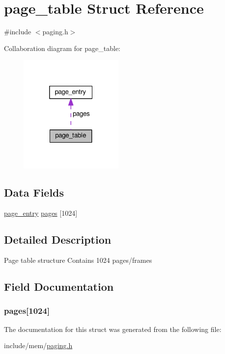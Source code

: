 \hypertarget{structpage__table}{}\section{page\+\_\+table Struct Reference}
\label{structpage__table}


{\ttfamily \#include $<$paging.\+h$>$}



Collaboration diagram for page\+\_\+table\+:\nopagebreak
\begin{figure}[H]
\begin{center}
\leavevmode
\includegraphics[width=145pt]{structpage__table__coll__graph}
\end{center}
\end{figure}
\subsection*{Data Fields}
\begin{DoxyCompactItemize}
\item 
\hyperlink{structpage__entry}{page\+\_\+entry} \hyperlink{structpage__table_a5cca43bbc67fbbb87eedf886c6e32efb}{pages} \mbox{[}1024\mbox{]}
\end{DoxyCompactItemize}


\subsection{Detailed Description}
Page table structure Contains 1024 pages/frames 

\subsection{Field Documentation}
\subsubsection[{\texorpdfstring{pages}{pages}}]{ pages\mbox{[}1024\mbox{]}}\hypertarget{structpage__table_a5cca43bbc67fbbb87eedf886c6e32efb}{}\label{structpage__table_a5cca43bbc67fbbb87eedf886c6e32efb}


The documentation for this struct was generated from the following file\+:\begin{DoxyCompactItemize}
\item 
include/mem/\hyperlink{paging_8h}{paging.\+h}\end{DoxyCompactItemize}

